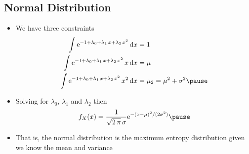 
\begin{slide}
\section[-2]{Normal Distribution}
  
\begin{PauseHighLight}\small
  \begin{itemize}
  \item We have three constraints
    \begin{align*}
      \int \e{-1 + \lambda_0 + \lambda_1\, x + \lambda_2\, x^2} \,\dd x &= 1
      \\
      \int \e{-1 + \lambda_0 + \lambda_1\, x + \lambda_2\, x^2} \,x\, \dd x
                                                                        &= \mu \\
      \int \e{-1 + \lambda_0 + \lambda_1\, x + \lambda_2\, x^2} \,x^2\, \dd
      x &= \mu_2 =  \mu^2 + \sigma^2\pause
    \end{align*}
  \item Solving for $\lambda_0$, $\lambda_1$ and $\lambda_2$ then
     \begin{align*}
       f_X(x) = \frac{1}{\sqrt{2\,\pi}\, \sigma} \e{-(x-\mu)^2/(2\sigma^2)}\pause
     \end{align*}
   \item That is, the normal distribution is the maximum entropy
     distribution given we know the mean and variance\pause
  \end{itemize}
\end{PauseHighLight}

\end{slide}


